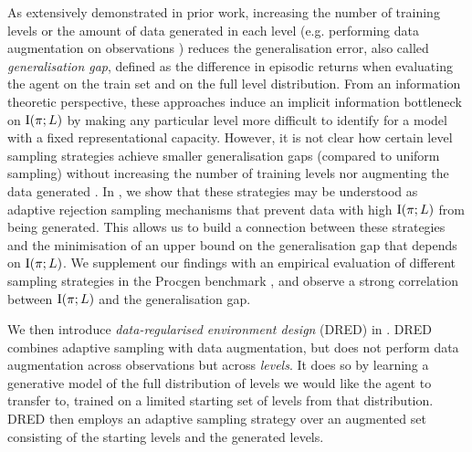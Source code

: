 \documentclass{article}
\theoremstyle{plain}
\theoremstyle{definition}
\theoremstyle{remark}
\begin{document}
As extensively demonstrated in prior work, increasing the number of training levels \citep{OverfittingDRL,procgen,Packer2018AssessingGI} or the amount of data generated in each level (e.g. performing data augmentation on observations \citep{raileanu2021UCB-DrAC,Kostrikov2021ImageAllYouNeed}) reduces the generalisation error, also called \textit{generalisation gap}, defined as the difference in episodic returns when evaluating the agent on the train set and on the full level distribution. From an information theoretic perspective, these approaches induce an implicit information bottleneck on $\text{I}(\pi;L)$ by making any particular level more difficult to identify for a model with a fixed representational capacity. However, it is not clear how certain level sampling strategies achieve smaller generalisation gaps (compared to uniform sampling) without increasing the number of training levels nor augmenting the data generated \citep{PLR,Robust-PLR}. In , we show that these strategies may be understood as adaptive rejection sampling mechanisms that prevent data with high $\text{I}(\pi;L)$ from being generated. This allows us to build a connection between these strategies and the minimisation of an upper bound on the generalisation gap that depends on $\text{I}(\pi;L)$. We supplement our findings with an empirical evaluation of different sampling strategies in the Procgen benchmark \citep{procgen}, and observe a strong correlation between $\text{I}(\pi;L)$ and the generalisation gap.

We then introduce \textit{data-regularised environment design} (DRED) in . DRED combines adaptive sampling with data augmentation, but does not perform data augmentation across observations but across \textit{levels}. It does so by learning a generative model of the full distribution of levels we would like the agent to transfer to, trained on a limited starting set of levels from that distribution. DRED then employs an adaptive sampling strategy over an augmented set consisting of the starting levels and the generated levels.
\end{document}
